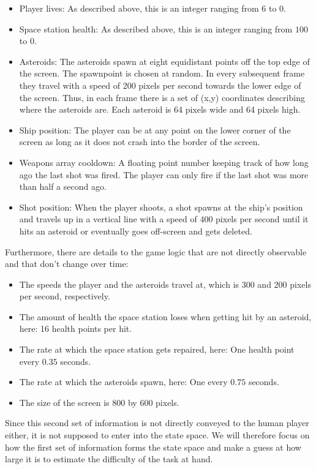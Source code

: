 \documentclass[a4paper,10pt]{article}
\begin{document}
\begin{itemize}
 \item Player lives: As described above, this is an integer ranging from $6$ to $0$.
 \item Space station health: As described above, this is an integer ranging from $100$ to $0$.
 \item Asteroids: The asteroids spawn at eight equidistant points off the top edge of the screen. The spawnpoint is chosen at random. In every subsequent frame they travel with a speed of 200 pixels per second towards the lower edge of the screen. Thus, in each frame there is a set of (x,y) coordinates describing where the asteroids are. Each asteroid is 64 pixels wide and 64 pixels high.
 \item Ship position: The player can be at any point on the lower corner of the screen as long as it does not crash into the border of the screen.
 \item Weapons array cooldown: A floating point number keeping track of how long ago the last shot was fired. The player can only fire if the last shot was more than half a second ago.
 \item Shot position: When the player shoots, a shot spawns at the ship's position and travels up in a vertical line with a speed of $400$ pixels per second until it hits an asteroid or eventually goes off-screen and gets deleted.
\end{itemize}
Furthermore, there are details to the game logic that are not directly observable and that don't change over time:
\begin{itemize}
 \item The speeds the player and the asteroids travel at, which is 300 and 200 pixels per second, respectively.
 \item The amount of health the space station loses when getting hit by an asteroid, here: 16 health points per hit.
 \item The rate at which the space station gets repaired, here: One health point every $0.35$ seconds.
 \item The rate at which the asteroids spawn, here: One every $0.75$ seconds.
 \item The size of the screen is 800 by 600 pixels.
\end{itemize}

Since this second set of information is not directly conveyed to the human player either, it is not supposed to enter into the state space.
We will therefore focus on how the first set of information forms the state space and make a guess at how large it is to estimate the difficulty of the task at hand.
\end{document}
